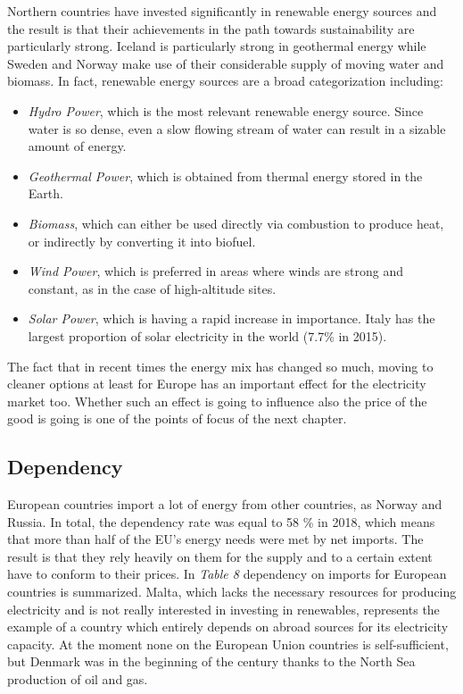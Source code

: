 \documentclass{book}
\begin{document}
Northern countries have invested significantly in renewable energy sources and the result is that their achievements in the path towards sustainability are particularly strong. Iceland is particularly strong in geothermal energy while Sweden and Norway make use of their considerable supply of moving water and biomass. In fact, renewable energy sources are a broad categorization including:

\begin{itemize}
\item \textit{Hydro Power}, which is the most relevant renewable energy source. Since water is so dense, even a slow flowing stream of water can result in a sizable amount of energy.
\item \textit{Geothermal Power}, which is obtained from thermal energy stored in the Earth.
\item \textit{Biomass}, which can either be used directly via combustion to produce heat, or indirectly by converting it into biofuel.
\item \textit{Wind Power}, which is preferred in areas where winds are strong and constant, as in the case of high-altitude sites.
\item \textit{Solar Power}, which is having a rapid increase in importance. Italy has the largest proportion of solar electricity in the world (7.7\% in 2015).
\end{itemize}

The fact that in recent times the energy mix has changed so much, moving to cleaner options at least for Europe has an important effect for the electricity market too. Whether such an effect is going to influence also the price of the good is going is one of the points of focus of the next chapter.

\subsection*{Dependency}

European countries import a lot of energy from other countries, as Norway and Russia. In total, the dependency rate was equal to 58 \% in 2018, which means that more than half of the EU’s energy needs were met by net imports. The result is that they rely heavily on them for the supply and to a certain extent have to conform to their prices. In \textit{Table 8} dependency on imports for European countries is summarized. Malta, which lacks the necessary resources for producing electricity and is not really interested in investing in renewables, represents the example of a country which entirely depends on abroad sources for its electricity capacity. At the moment none on the European Union countries is self-sufficient, but Denmark was in the beginning of the century thanks to the North Sea production of oil and gas.
\end{document}
